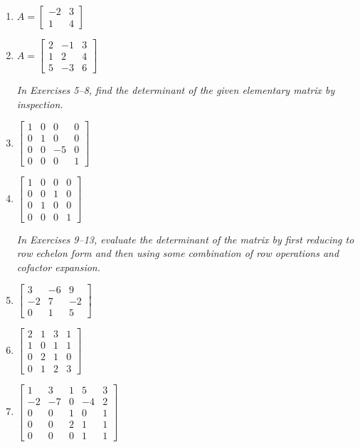 \documentclass{article}
\theoremstyle{mystyle}
\begin{document}
\begin{enumerate}

\item[1.] $A=\begin{bmatrix}-2&3\\1&4\end{bmatrix}$

\item[3.] $A=\begin{bmatrix}2&-1&3\\1&2&4\\5&-3&6\end{bmatrix}$

\noindent\textit{In Exercises 5--8, find the determinant of the given elementary matrix by inspection.}

\item[5.] $\begin{bmatrix}1&0&0&0\\0&1&0&0\\0&0&-5&0\\0&0&0&1\end{bmatrix}$

\item[7.] $\begin{bmatrix}1&0&0&0\\0&0&1&0\\0&1&0&0\\0&0&0&1\end{bmatrix}$

\noindent\textit{In Exercises 9--13, evaluate the determinant of the matrix by first reducing to row echelon form and then using some combination of row operations and cofactor expansion.}

\item[9.] $\begin{bmatrix}3&-6&9\\-2&7&-2\\0&1&5\end{bmatrix}$

\item[11.] $\begin{bmatrix}2&1&3&1\\1&0&1&1\\0&2&1&0\\0&1&2&3\end{bmatrix}$

\item[13.] $\begin{bmatrix}1&3&1&5&3\\-2&-7&0&-4&2\\0&0&1&0&1\\0&0&2&1&1\\0&0&0&1&1\end{bmatrix}$


\end{enumerate}
\end{document}
